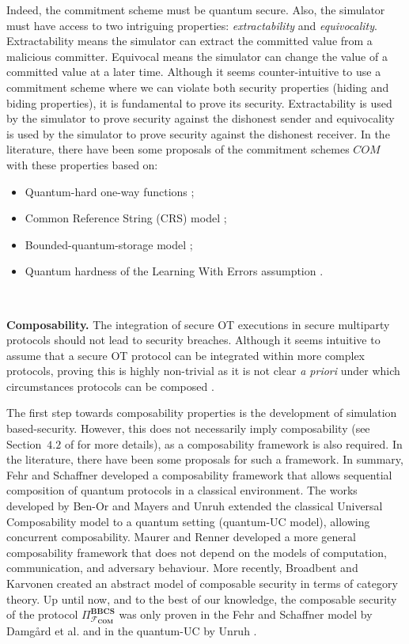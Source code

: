 Indeed, the commitment scheme must be quantum secure. Also, the simulator must have access to two intriguing properties: \textit{extractability} and \textit{equivocality}. Extractability means the simulator can extract the committed value from a malicious committer. Equivocal means the simulator can change the value of a committed value at a later time. Although it seems counter-intuitive to use a commitment scheme where we can violate both security properties (hiding and biding properties), it is fundamental to prove its security. Extractability is used by the simulator to prove security against the dishonest sender and equivocality is used by the simulator to prove security against the dishonest receiver. In the literature, there have been some proposals of the commitment schemes $COM$ with these properties based on:

\begin{itemize}
    \item Quantum-hard one-way functions \cite{BCKM21, GLSV21};
    \item Common Reference String (CRS) model \cite{U10, CF01};
    \item Bounded-quantum-storage model \cite{U11};
    \item Quantum hardness of the Learning With Errors assumption \cite{DFLSS09}.
\end{itemize}

\

\noindent\textbf{Composability.} The integration of secure OT executions in secure multiparty protocols \cite{Y86} should not lead to security breaches. Although it seems intuitive to assume that a secure OT protocol can be integrated within more complex protocols, proving this is highly non-trivial as it is not clear \textit{a priori} under which circumstances protocols can be composed \cite{MR09}. 

The first step towards composability properties is the development of simulation based-security. However, this does not necessarily imply composability (see Section~$4.2$ of \cite{MR09} for more details), as a composability framework is also required. In the literature, there have been some proposals for such a framework. In summary, Fehr and Schaffner \cite{FS09} developed a composability framework that allows sequential composition of quantum protocols in a classical environment. The works developed by Ben-Or and Mayers \cite{BM04} and Unruh \cite{U04, U10} extended the classical Universal Composability model \cite{C20} to a quantum setting (quantum-UC model), allowing concurrent composability. Maurer and Renner \cite{MR11} developed a more general composability framework that does not depend on the models of computation, communication, and adversary behaviour. More recently, Broadbent and Karvonen \cite{BK22} created an abstract model of composable security in terms of category theory. Up until now, and to the best of our knowledge, the composable security of the protocol $\Pi^{\textbf{BBCS}}_{\mathcal{F}_{\textbf{COM}}}$ was only proven in the Fehr and Schaffner model \cite{FS09} by Damg{\aa}rd et al. \cite{DFLSS09} and in the quantum-UC by Unruh \cite{U10}.



